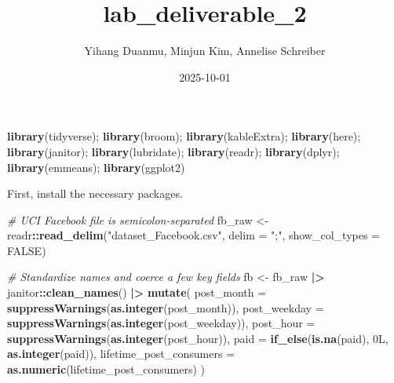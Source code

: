 \documentclass[
]{article}
\title{lab\_deliverable\_2}
\author{Yihang Duanmu, Minjun Kim, Annelise Schreiber}
\date{2025-10-01}
\newenvironment{Shaded}{\begin{snugshade}}{\end{snugshade}}
\newcommand{\AttributeTok}[1]{\textcolor[rgb]{0.13,0.29,0.53}{#1}}
\newcommand{\CommentTok}[1]{\textcolor[rgb]{0.56,0.35,0.01}{\textit{#1}}}
\newcommand{\ConstantTok}[1]{\textcolor[rgb]{0.56,0.35,0.01}{#1}}
\newcommand{\DataTypeTok}[1]{\textcolor[rgb]{0.13,0.29,0.53}{#1}}
\newcommand{\DecValTok}[1]{\textcolor[rgb]{0.00,0.00,0.81}{#1}}
\newcommand{\FunctionTok}[1]{\textcolor[rgb]{0.13,0.29,0.53}{\textbf{#1}}}
\newcommand{\NormalTok}[1]{#1}
\newcommand{\OtherTok}[1]{\textcolor[rgb]{0.56,0.35,0.01}{#1}}
\newcommand{\SpecialCharTok}[1]{\textcolor[rgb]{0.81,0.36,0.00}{\textbf{#1}}}
\newcommand{\StringTok}[1]{\textcolor[rgb]{0.31,0.60,0.02}{#1}}
\begin{document}
\maketitle

\begin{Shaded}
\begin{Highlighting}[]
\FunctionTok{library}\NormalTok{(tidyverse); }\FunctionTok{library}\NormalTok{(broom); }\FunctionTok{library}\NormalTok{(kableExtra); }\FunctionTok{library}\NormalTok{(here); }\FunctionTok{library}\NormalTok{(janitor); }\FunctionTok{library}\NormalTok{(lubridate); }\FunctionTok{library}\NormalTok{(readr); }\FunctionTok{library}\NormalTok{(dplyr); }\FunctionTok{library}\NormalTok{(emmeans); }\FunctionTok{library}\NormalTok{(ggplot2)}
\end{Highlighting}
\end{Shaded}

First, install the necessary packages.

\begin{Shaded}
\begin{Highlighting}[]
\CommentTok{\# UCI Facebook file is semicolon{-}separated}
\NormalTok{fb\_raw }\OtherTok{\textless{}{-}}\NormalTok{ readr}\SpecialCharTok{::}\FunctionTok{read\_delim}\NormalTok{(}\StringTok{"dataset\_Facebook.csv"}\NormalTok{, }\AttributeTok{delim =} \StringTok{";"}\NormalTok{, }\AttributeTok{show\_col\_types =} \ConstantTok{FALSE}\NormalTok{)}

\CommentTok{\# Standardize names and coerce a few key fields}
\NormalTok{fb }\OtherTok{\textless{}{-}}\NormalTok{ fb\_raw }\SpecialCharTok{|\textgreater{}}
\NormalTok{  janitor}\SpecialCharTok{::}\FunctionTok{clean\_names}\NormalTok{() }\SpecialCharTok{|\textgreater{}}
  \FunctionTok{mutate}\NormalTok{(}
    \AttributeTok{post\_month   =} \FunctionTok{suppressWarnings}\NormalTok{(}\FunctionTok{as.integer}\NormalTok{(post\_month)),}
    \AttributeTok{post\_weekday =} \FunctionTok{suppressWarnings}\NormalTok{(}\FunctionTok{as.integer}\NormalTok{(post\_weekday)),}
    \AttributeTok{post\_hour    =} \FunctionTok{suppressWarnings}\NormalTok{(}\FunctionTok{as.integer}\NormalTok{(post\_hour)),}
    \AttributeTok{paid         =} \FunctionTok{if\_else}\NormalTok{(}\FunctionTok{is.na}\NormalTok{(paid), }\DecValTok{0}\DataTypeTok{L}\NormalTok{, }\FunctionTok{as.integer}\NormalTok{(paid)),}
    \AttributeTok{lifetime\_post\_consumers =} \FunctionTok{as.numeric}\NormalTok{(lifetime\_post\_consumers)}
\NormalTok{  )}
\end{Highlighting}
\end{Shaded}
\end{document}
